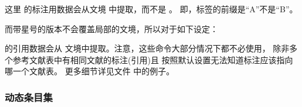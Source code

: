 \begin{ltxexample}[style=latex]{}
\cite{key1}
\begin{refcontext}[labelprefix=B]
\cite{key2}
\end{refcontext}
\end{ltxexample}
%

这里  的标注用数据会从文境  中提取，而不是 。
即，标签的前缀是“A”不是“B”。

而带星号的版本不会覆盖局部的文境，所以对于如下设定：

\begin{ltxexample}[style=latex]{}
\cite{key1}
\begin{refcontext}[labelprefix=B]
\cite{key2}
\end{refcontext}
\end{ltxexample}
%
 的引用数据会从  文境中提取。注意，这些命令大部分情况下都不必使用，
除非多个参考文献表中有相同文献的标注(引用)且 \biblatex 按照默认设置无法知道标注应该指向哪一个文献表。
更多细节详见文件  中的例子。

\subsubsection{动态条目集}%
\label{use:bib:set}


